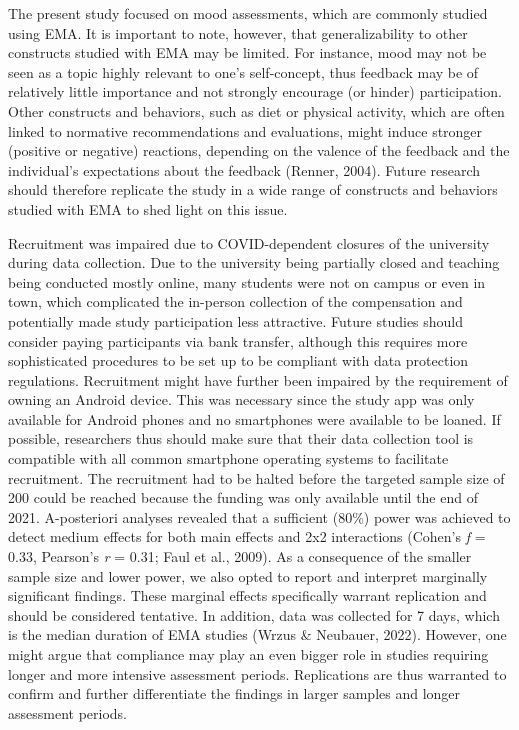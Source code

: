 \documentclass[authordate, empirical]{jote-new-article}
\begin{document}
	The present study focused on mood assessments, which are commonly studied using EMA. It is important to note, however, that generalizability to other constructs studied with EMA may be limited. For instance, mood may not be seen as a topic highly relevant to one's self-concept, thus feedback may be of relatively little importance and not strongly encourage (or hinder) participation. Other constructs and behaviors, such as diet or physical activity, which are often linked to normative recommendations and evaluations, might induce stronger (positive or negative) reactions, depending on the valence of the feedback and the individual's expectations about the feedback (Renner, 2004). Future research should therefore replicate the study in a wide range of constructs and behaviors studied with EMA to shed light on this issue.



	Recruitment was impaired due to COVID-dependent closures of the university during data collection. Due to the university being partially closed and teaching being conducted mostly online, many students were not on campus or even in town, which complicated the in-person collection of the compensation and potentially made study participation less attractive. Future studies should consider paying participants via bank transfer, although this requires more sophisticated procedures to be set up to be compliant with data protection regulations. Recruitment might have further been impaired by the requirement of owning an Android device. This was necessary since the study app was only available for Android phones and no smartphones were available to be loaned. If possible, researchers thus should make sure that their data collection tool is compatible with all common smartphone operating systems to facilitate recruitment. The recruitment had to be halted before the targeted sample size of 200 could be reached because the funding was only available until the end of 2021. A-posteriori analyses revealed that a sufficient (80\%) power was achieved to detect medium effects for both main effects and 2x2 interactions (Cohen's \emph{f} = 0.33, Pearson's \emph{r} = 0.31; Faul et al., 2009). As a consequence of the smaller sample size and lower power, we also opted to report and interpret marginally significant findings. These marginal effects specifically warrant replication and should be considered tentative. In addition, data was collected for 7 days, which is the median duration of EMA studies (Wrzus \& Neubauer, 2022). However, one might argue that compliance may play an even bigger role in studies requiring longer and more intensive assessment periods. Replications are thus warranted to confirm and further differentiate the findings in larger samples and longer assessment periods.
\end{document}
